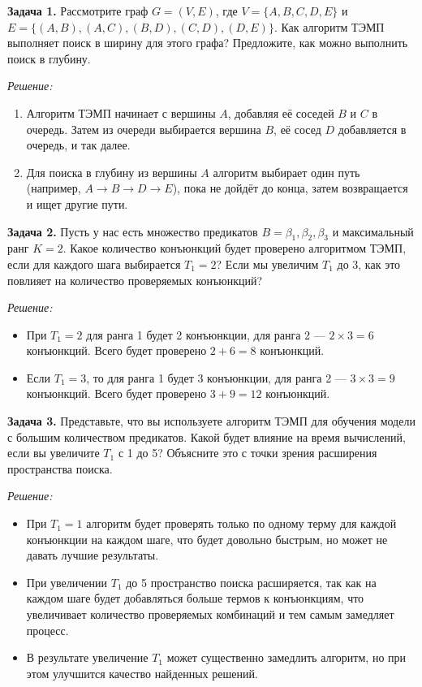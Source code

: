 \textbf{Задача 1.}
\newline
Рассмотрите граф $G = (V, E)$, где $V = \{A, B, C, D, E\}$ и $E = \{(A, B), (A, C), (B, D), (C, D), (D, E)\}$. Как алгоритм ТЭМП выполняет поиск в ширину для этого графа? Предложите, как можно выполнить поиск в глубину.

\textit{Решение:}
\begin{enumerate}
    \item Алгоритм ТЭМП начинает с вершины $A$, добавляя её соседей $B$ и $C$ в очередь. Затем из очереди выбирается вершина $B$, её сосед $D$ добавляется в очередь, и так далее.
    \item Для поиска в глубину из вершины $A$ алгоритм выбирает один путь (например, $A \to B \to D \to E$), пока не дойдёт до конца, затем возвращается и ищет другие пути.
\end{enumerate}

\textbf{Задача 2.}
\newline
Пусть у нас есть множество предикатов $B = \beta_1, \beta_2, \beta_3$ и максимальный ранг $K = 2$. Какое количество конъюнкций будет проверено алгоритмом ТЭМП, если для каждого шага выбирается $T_1 = 2$? Если мы увеличим $T_1$ до 3, как это повлияет на количество проверяемых конъюнкций?

\textit{Решение:}
\begin{itemize}
    \item При $T_1 = 2$ для ранга 1 будет 2 конъюнкции, для ранга 2 --- $2 \times 3 = 6$ конъюнкций. Всего будет проверено $2 + 6 = 8$ конъюнкций.
    \item Если $T_1 = 3$, то для ранга 1 будет 3 конъюнкции, для ранга 2 --- $3 \times 3 = 9$ конъюнкций. Всего будет проверено $3 + 9 = 12$ конъюнкций.
\end{itemize}

\textbf{Задача 3.}
\newline
Представьте, что вы используете алгоритм ТЭМП для обучения модели с большим количеством предикатов. Какой будет влияние на время вычислений, если вы увеличите $T_1$ с 1 до 5? Объясните это с точки зрения расширения пространства поиска.

\textit{Решение:}
\begin{itemize}
    \item При $T_1 = 1$ алгоритм будет проверять только по одному терму для каждой конъюнкции на каждом шаге, что будет довольно быстрым, но может не давать лучшие результаты.
    \item При увеличении $T_1$ до 5 пространство поиска расширяется, так как на каждом шаге будет добавляться больше термов к конъюнкциям, что увеличивает количество проверяемых комбинаций и тем самым замедляет процесс.
    \item В результате увеличение $T_1$ может существенно замедлить алгоритм, но при этом улучшится качество найденных решений.
\end{itemize}


